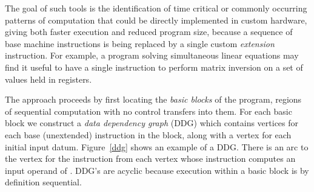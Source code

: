 \documentclass[11pt]{article}
\newcommand{\2}{\vspace{0.2 cm}}
\begin{document}
The goal of such tools is the identification of time critical or
commonly occurring patterns of computation that could be directly
implemented in custom hardware, giving both faster execution and
reduced program size, because a sequence of base machine
instructions is being replaced by a single custom {\em extension}
instruction. For example, a program solving simultaneous linear
equations may find it useful to have a single instruction to perform
matrix inversion on a set of values held in registers.



The approach proceeds by first locating the {\em basic blocks} of
the program, regions of sequential computation with no control
transfers into them. For each basic block we construct a {\em data
dependency graph} (DDG) which contains vertices for each base
(unextended) instruction in the block, along with a vertex for each
initial input datum. Figure~\ref{ddg} shows an example of a DDG.
There is an arc to the vertex for the instruction  from each
vertex whose instruction computes an input operand of . DDG's are
acyclic because execution within a basic block is by definition
sequential.
\end{document}
